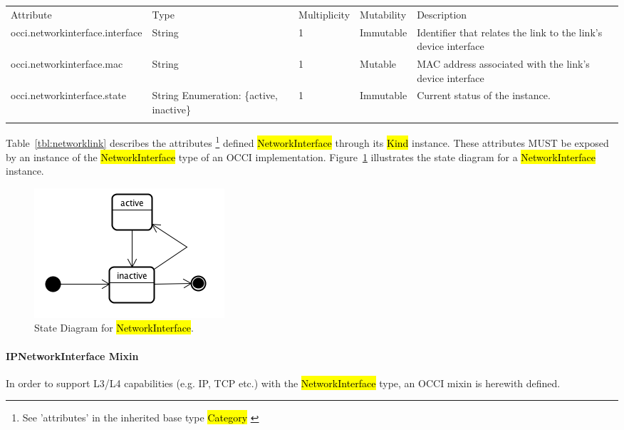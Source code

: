 \documentclass[10pt,a4paper]{article}
\begin{document}
{
	\begin{tabular}{lp{2.5cm}p{1cm}lp{6cm}}
	\toprule
	Attribute&Type&Multi\-plicity&Mutability&Description\\
	\colrule
	occi.networkinterface.interface & String & 1 & Immutable 
	& Identifier that relates the link to the link's device interface\\
	occi.networkinterface.mac & String & 1 & Mutable 
	& MAC address associated with the link's device interface\\
	occi.networkinterface.state & String Enumeration: \{active, inactive\}& 1 
	& Immutable & Current status of the instance.\\
	\botrule
	\end{tabular}
}
Table~\ref{tbl:networklink} describes the attributes \footnote{See ’attributes’ in the inherited 
base type \hl{Category}  \cite{occi:core}} 
defined \hl{NetworkInterface} through its \hl{Kind} instance. These attributes
MUST be exposed by an instance of the \hl{NetworkInterface} type of an OCCI implementation. 
Figure~\ref{fig:networklink_state} illustrates the state diagram for a \hl{NetworkInterface} instance.

\begin{figure}[!h]
	\centering
	\includegraphics[scale=0.4]{figs/infra-link-state.png}
	\caption{State Diagram for \hl{NetworkInterface}.}
	\label{fig:networklink_state}
\end{figure}

\paragraph{IPNetworkInterface Mixin}
In order to support L3/L4 capabilities (e.g. IP, TCP etc.) with the \hl{NetworkInterface} type, an 
OCCI mixin is herewith defined.
\end{document}

